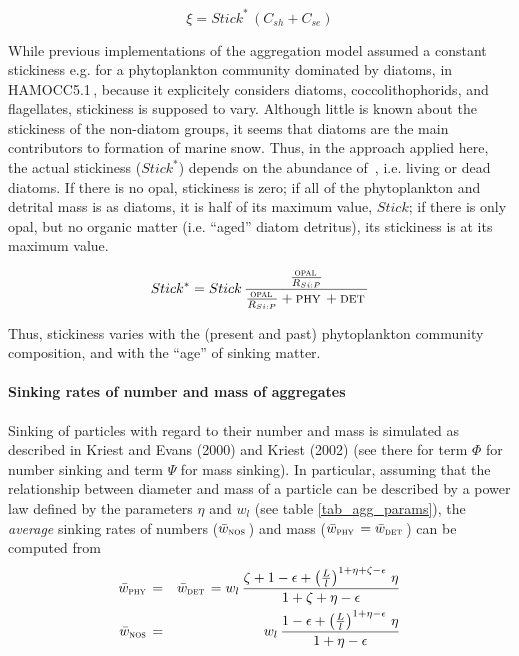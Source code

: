 \documentclass[11pt,a4paper,fleqn,twoside]{article}
\def\phy{\text{\textsc{phy}}\,}
\def\det{\text{\textsc{det}}\,}
\def\opal{\text{\textsc{opal}}\,}
\def\nos{\text{\textsc{nos}}\,}
\newcommand{\ham}{HAMOCC5.1\,}
\begin{document}
\begin{equation}
\xi = Stick^* \, \left( C_{sh} + C_{se} \right)
\end{equation}

While previous implementations of the aggregation model assumed a constant
stickiness e.g. for a phytoplankton community dominated by diatoms, in \ham,
because it explicitely considers  diatoms, coccolithophorids, and flagellates,
stickiness is supposed to vary. Although little is known about the stickiness
of the non-diatom groups, it seems that diatoms are the main contributors to
formation of marine snow. Thus, in the approach applied here, the actual stickiness
($Stick^*$) depends on the abundance of \opal, i.e. living or dead diatoms. If
there is no opal, stickiness is zero; if all of the phytoplankton and detrital
mass  is as diatoms, it is half of its maximum value, $Stick$; if there is only
opal, but no organic matter (i.e. ``aged'' diatom detritus), its stickiness is
at its maximum value.

\begin{equation}
Stick^*=Stick\,\frac{\frac{\opal}{R_{Si:P}}}{\frac{\opal}{R_{Si:P}}+\phy+\det}
\end{equation} 

Thus, stickiness varies with the (present and past) phytoplankton community
composition, and with the ``age'' of sinking matter. 

\paragraph{Sinking rates of number and mass of aggregates} Sinking of particles with
regard to their number and mass is
simulated as described in Kriest and Evans (2000) and Kriest (2002) (see there
for term $\Phi$ for number sinking and  term $\Psi$ for mass sinking). In
particular, assuming that the relationship between diameter and mass of a
particle can be described by a power law defined by the parameters $\eta$ and
$w_l$ (see table \ref{tab_agg_params}), the {\em average} sinking rates of
numbers ($\bar{w}_{\nos}$) and mass ($\bar{w}_{\phy}=\bar{w}_{\det}$) can be 
computed  from
\begin{eqnarray}
\bar{w}_{\phy} & = & \bar{w}_{\det} = w_l \, \frac{\zeta+1-\epsilon
+\left(\frac{L}{l}\right)^{1+\eta+\zeta-\epsilon}\,\eta}{1+\zeta+\eta-\epsilon}\\
\bar{w}_{\nos} & = & w_l \, \frac{1-\epsilon
+\left(\frac{L}{l}\right)^{1+\eta-\epsilon}\,\eta}{1+\eta-\epsilon}
\end{eqnarray}
\end{document}
